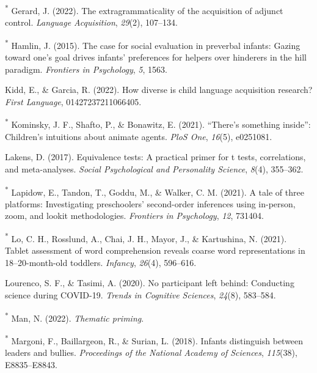 \documentclass[
  man,floatsintext]{apa6}
\newlength{\cslhangindent}
\newlength{\cslentryspacingunit} %
\newenvironment{CSLReferences}[2] %
 {%
  \setlength{\parindent}{0pt}
  \ifodd #1
  \let\oldpar\par
  \def\par{\hangindent=\cslhangindent\oldpar}
  \fi
  \setlength{\parskip}{#2\cslentryspacingunit}
 }%
 {}
\begin{document}
\begin{CSLReferences}{1}{0}
\leavevmode{}%
\textsuperscript{*} Gerard, J. (2022). The extragrammaticality of the acquisition of adjunct control. \emph{Language Acquisition}, \emph{29}(2), 107--134.

\leavevmode{}%
\textsuperscript{*} Hamlin, J. (2015). The case for social evaluation in preverbal infants: Gazing toward one's goal drives infants' preferences for helpers over hinderers in the hill paradigm. \emph{Frontiers in Psychology}, \emph{5}, 1563.

\leavevmode{}%
Kidd, E., \& Garcia, R. (2022). How diverse is child language acquisition research? \emph{First Language}, 01427237211066405.

\leavevmode{}%
\textsuperscript{*} Kominsky, J. F., Shafto, P., \& Bonawitz, E. (2021). {``There's something inside''}: Children's intuitions about animate agents. \emph{PloS One}, \emph{16}(5), e0251081.

\leavevmode{}%
Lakens, D. (2017). Equivalence tests: A practical primer for t tests, correlations, and meta-analyses. \emph{Social Psychological and Personality Science}, \emph{8}(4), 355--362.

\leavevmode{}%
\textsuperscript{*} Lapidow, E., Tandon, T., Goddu, M., \& Walker, C. M. (2021). A tale of three platforms: Investigating preschoolers' second-order inferences using in-person, zoom, and lookit methodologies. \emph{Frontiers in Psychology}, \emph{12}, 731404.

\leavevmode{}%
\textsuperscript{*} Lo, C. H., Rosslund, A., Chai, J. H., Mayor, J., \& Kartushina, N. (2021). Tablet assessment of word comprehension reveals coarse word representations in 18--20-month-old toddlers. \emph{Infancy}, \emph{26}(4), 596--616.

\leavevmode{}%
Lourenco, S. F., \& Tasimi, A. (2020). No participant left behind: Conducting science during COVID-19. \emph{Trends in Cognitive Sciences}, \emph{24}(8), 583--584.

\leavevmode{}%
\textsuperscript{*} Man, N. (2022). \emph{Thematic priming}.

\leavevmode{}%
\textsuperscript{*} Margoni, F., Baillargeon, R., \& Surian, L. (2018). Infants distinguish between leaders and bullies. \emph{Proceedings of the National Academy of Sciences}, \emph{115}(38), E8835--E8843.


\end{CSLReferences}
\end{document}

